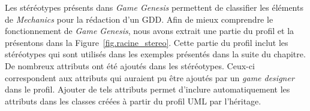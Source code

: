Les stéréotypes présents dans \emph{Game Genesis} permettent de classifier les \'el\'ements de \emph{Mechanics} pour la rédaction d'un GDD.
Afin de mieux comprendre le fonctionnement de \emph{Game Genesis}, nous avons extrait une partie du profil et la pr\'esentons dans la Figure~\ref{fig.racine_stereo}.
Cette partie du profil inclut les stéréotypes qui sont utilisés dans les exemples présentés dans la suite du chapitre.
De nombreux attributs ont été ajoutés dans les stéréotypes.
Ceux-ci correspondent aux attributs qui auraient pu être ajoutés par un \emph{game designer} dans le profil.
Ajouter de tels attributs permet d'inclure automatiquement les attributs dans les classes créées à partir du profil UML par l'héritage.

